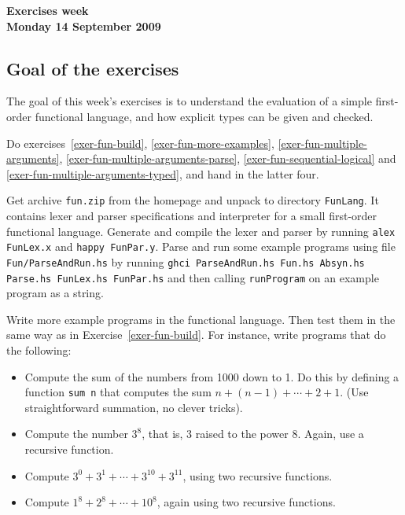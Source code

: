 \documentclass[a4paper]{article}
\begin{document}
\begin{center}
{\Large\bf Exercises week \\[1ex]
Monday 14 September 2009}\\[1ex]
\end{center}

\subsection*{Goal of the exercises}

The goal of this week's exercises is to understand the evaluation of a
simple first-order functional language, and how explicit types can be
given and checked.

Do exercises~\ref{exer-fun-build}, \ref{exer-fun-more-examples},
\ref{exer-fun-multiple-arguments},
\ref{exer-fun-multiple-arguments-parse},
\ref{exer-fun-sequential-logical} and
\ref{exer-fun-multiple-arguments-typed}, and hand in the latter four.

\begin{exercise}\label{exer-fun-build}
  Get archive \texttt{fun.zip} from the homepage and unpack to
  directory \texttt{FunLang}\@.  It contains lexer and parser
  specifications and interpreter for a small first-order functional
  language.  Generate and compile the lexer and parser by running
  \texttt{alex FunLex.x} and \texttt{happy FunPar.y}\@.  Parse and run some example programs using
  file \texttt{Fun/ParseAndRun.hs} by running \texttt{ghci ParseAndRun.hs Fun.hs Absyn.hs Parse.hs FunLex.hs FunPar.hs} and then calling \texttt{runProgram} on an example program as a string.
\end{exercise}


\begin{exercise}\label{exer-fun-more-examples}
  Write more example programs in the functional language.  Then test
  them in the same way as in Exercise~\ref{exer-fun-build}\@.  For
  instance, write programs that do the following:

  \begin{itemize}
  \item Compute the sum of the numbers from 1000 down to 1.  Do this
    by defining a function \texttt{sum n} that computes the sum
    $n+(n-1)+\cdots + 2 + 1$.  (Use straightforward summation, no
    clever tricks).

  \item Compute the number $3^8$, that is, 3 raised to the power 8.
    Again, use a recursive function.

  \item Compute $3^0 + 3^1 + \cdots + 3^{10} + 3^{11}$, using two
    recursive functions.

  \item Compute $1^8 + 2^8 + \cdots + 10^8$, again using two recursive
    functions.
  \end{itemize}
\end{exercise}
\end{document}
